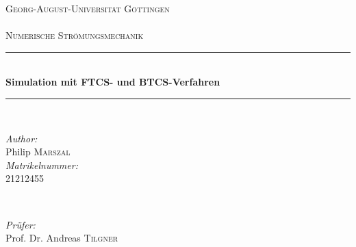 \begin{titlepage}

\newcommand{\HRule}{\rule{\linewidth}{0.5mm}} %

\center %


\textsc{\LARGE Georg-August-Universität Göttingen}\\[1.5cm] %
\textsc{\Large }\\[0.5cm] %
\textsc{\large Numerische Strömungsmechanik}\\[0.5cm] %


\HRule \\[0.4cm]
{ \Large \bfseries Simulation mit FTCS- und BTCS-Verfahren}\\[0.4cm] %
\HRule \\[1.5cm]


\begin{minipage}{0.4\textwidth}
\begin{flushleft} \large
\emph{Author:}\\
Philip \textsc{Marszal} \\
\emph{Matrikelnummer:}\\
21212455
\end{flushleft}
\end{minipage}
~
\begin{minipage}{0.4\textwidth}
\begin{flushright} \large
\emph{Prüfer:} \\
Prof. Dr. Andreas \textsc{Tilgner} %
\end{flushright}
\end{minipage}\\[2cm]


\end{titlepage}
